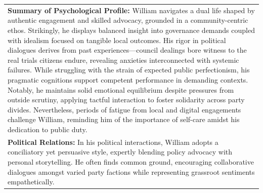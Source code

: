 \documentclass[11pt]{article}
\begin{document}
\begin{table}[ht]
\begin{tabularx}{\textwidth}{X}
\textbf{Summary of Psychological Profile:} William navigates a dual life shaped by authentic engagement and skilled advocacy, grounded in a community-centric ethos. Strikingly, he displays balanced insight into governance demands coupled with idealism focused on tangible local outcomes. His rigor in political dialogues derives from past experiences—council dealings bore witness to the real trials citizens endure, revealing anxieties interconnected with systemic failures. While struggling with the strain of expected public perfectionism, his pragmatic cognitions support competent performance in demanding contexts. Notably, he maintains solid emotional equilibrium despite pressures from outside scrutiny, applying tactful interaction to foster solidarity across party divides. Nevertheless, periods of fatigue from local and digital engagements challenge William, reminding him of the importance of self-care amidst his dedication to public duty. \\[4pt]

\textbf{Political Relations:} In his political interactions, William adopts a conciliatory yet persuasive style, expertly blending policy advocacy with personal storytelling. He often finds common ground, encouraging collaborative dialogues amongst varied party factions while representing grassroot sentiments empathetically. \\

\bottomrule
\end{tabularx}
\end{table}
\end{document}
